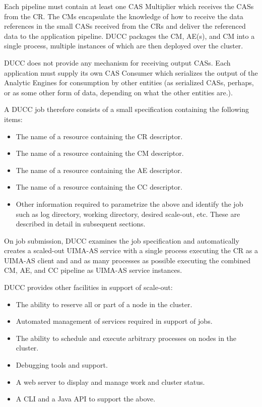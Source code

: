     Each pipeline must contain at least one CAS Multiplier which receives the CASs from the CR.  The
    CMs encapsulate the knowledge of how to receive the data references in the small CASs received
    from the CRs and deliver the referenced data to the application pipeline.  DUCC packages the CM,
    AE(s), and CM into a single process, multiple instances of which are then deployed over the
    cluster.

    DUCC does not provide any mechanism for receiving output CASs.  Each application must
    supply its own CAS Consumer which serializes the output of the Analytic Engines for 
    consumption by other entities (as serialized CASs, perhaps, or as some other form of
    data, depending on what the other entities are.).

    A DUCC job therefore consists of a small specification containing the following items:
    
    \begin{itemize}
      \item The name of a resource containing the CR descriptor.
      \item The name of a resource containing the CM descriptor.
      \item The name of a resource containing the AE descriptor.
      \item The name of a resource containing the CC descriptor.
      \item Other information required to parametrize the above and identify the job
        such as log directory, working directory, desired scale-out, etc.  These are
        described in detail in subsequent sections.
    \end{itemize}

    On job submission, DUCC examines the job specification and automatically creates a scaled-out
    UIMA-AS service with a single process executing the CR as a UIMA-AS client and and as many
    processes as possible executing the combined CM, AE, and CC pipeline as UIMA-AS service
    instances.

    DUCC provides other facilities in support of scale-out:
    \begin{itemize}
      \item The ability to reserve all or part of a node in the cluster.
      \item Automated management of services required in support of jobs.
      \item The ability to schedule and execute arbitrary processes on nodes in the
        cluster.
      \item Debugging tools and support.
      \item A web server to display and manage work and cluster status.
      \item A CLI and a Java API to support the above.
    \end{itemize}
    
